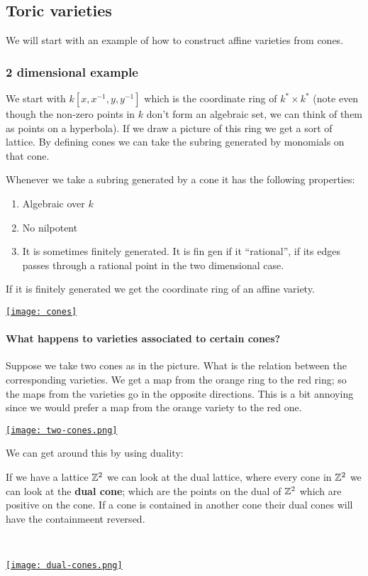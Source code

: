 \subsection{Toric varieties}
We will start with an example of how to construct affine varieties from cones. 

\subsubsection{2 dimensional example}

We start with $k[x,x^{-1},y,y^{-1}]$ which is the coordinate ring of $k^\ast\times k^\ast$ (note even though the non-zero points in $k$ don't form an algebraic set, we can think of them as points on a hyperbola). If we draw a picture of this ring we get a sort of lattice.  By defining cones we can take the subring generated by monomials on that cone. 

Whenever we take a subring generated by a cone it has the following properties:\begin{enumerate}
    \item Algebraic over $k$
    \item No nilpotent
    \item It is sometimes finitely generated. It is fin gen if it ``rational'', if its edges passes through a rational point in the two dimensional case.
\end{enumerate}

If it is finitely generated we get the coordinate ring of an affine variety.

\href{https://youtu.be/Sjp-99Xyiic?t=360}{\texttt{[image: cones]}}


\paragraph*{What happens to varieties associated to certain cones?}

Suppose we take two cones as in the picture. What is the relation between the corresponding varieties. We get a map from the orange ring to the red ring; so the maps from the varieties go in the opposite directions. This is a bit annoying since we would prefer a map from the orange variety to the red one.


\href{https://youtu.be/Sjp-99Xyiic?t=527}{\texttt{[image: two-cones.png]}}


We can get around this by using duality:

\begin{definition}
    If we have a lattice $\mathbb{Z}^2$ we can look at the dual lattice, where every cone in $\mathbb{Z}^2$ we can look at the \textbf{dual cone}; which are the points on the dual of $\mathbb{Z}^2$ which are positive on the cone. If a cone is contained in another cone their dual cones will have the containmeent reversed.

    \

    \href{https://youtu.be/Sjp-99Xyiic?t=527}{\texttt{[image: dual-cones.png]}}
\end{definition}

